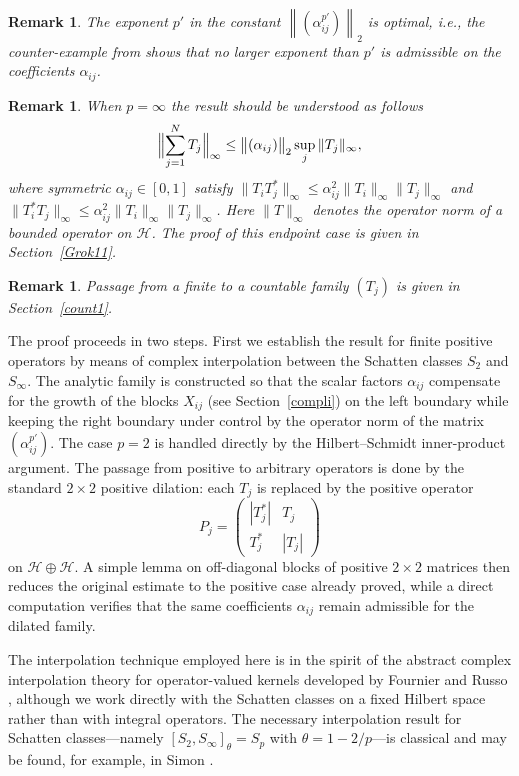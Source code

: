 \documentclass[10pt,a4paper]{amsart}
\newtheorem{remark}[theorem]{Remark}
\newcommand{\norm}[1]{\left\lVert #1 \right\rVert}
\newcommand{\1}{\mathbf{1}}
\begin{document}
\begin{remark}
    The exponent $p'$ in the constant  $\norm{(\alpha_{ij}^{p'})}_{2}$ is optimal, i.e.,  the counter-example from \cite{CDPIMW2026}
   shows that no larger exponent than $p'$ is admissible on the coefficients $\alpha_{ij}$.
\end{remark}

\begin{remark}
    When $p=\infty$ the result should be understood as follows 
\[
\Bigl\|\sum_{j=1}^N T_j\Bigr\|_{\infty}
\leq
\bigl\|(\alpha_{ij})\bigr\|_{2} \sup_{j} 
\|T_j\|_{\infty},
\]
where symmetric  $\alpha_{ij} \in [0,1]$ satisfy $\| T_{i}T_{j}^{*}\|_{\infty}\leq \alpha_{ij}^{2}\|T_{i}\|_{\infty}\|T_{j}\|_{\infty}$ and $\| T_{i}^{*}T_{j}\|_{\infty}\leq \alpha_{ij}^{2}\|T_{i}\|_{\infty}\|T_{j}\|_{\infty}$. Here $\| T\|_{\infty}$ denotes the operator norm of a bounded operator on $\mathcal{H}$. The proof of this endpoint case is given in Section~\ref{Grok11}.
\end{remark}

\begin{remark}
    Passage from a finite to a countable family $(T_{j})$ is given in Section~\ref{count1}.
\end{remark}

The proof proceeds in two steps. First we establish the result for finite positive operators by means of complex interpolation between the Schatten classes $S_2$ and $S_\infty$. The analytic family is constructed so that the scalar factors $\alpha_{ij}$ compensate for the growth of the blocks $X_{ij}$ (see Section~\ref{compli}) on the left boundary while keeping the right boundary under control by the operator norm of the matrix $(\alpha_{ij}^{p'})$. The case $p=2$ is handled directly by the Hilbert--Schmidt inner-product argument. The passage from positive to arbitrary operators is done by the standard $2\times 2$ positive dilation: each $T_j$ is replaced by the positive operator
\[
P_j=\begin{pmatrix}|T_j^*|&T_j\\T_j^*&|T_j|\end{pmatrix}
\]
on $\mathcal{H}\oplus\mathcal{H}$. A simple lemma on off-diagonal blocks of positive $2\times 2$ matrices then reduces the original estimate to the positive case already proved, while a direct computation verifies that the same coefficients $\alpha_{ij}$ remain admissible for the dilated family.

The interpolation technique employed here is in the spirit of the abstract complex interpolation theory for operator-valued kernels developed by Fournier and Russo \cite{FournierRusso1977}, although we work directly with the Schatten classes on a fixed Hilbert space rather than with integral operators. The necessary interpolation result for Schatten classes---namely $[S_2,S_\infty]_\theta=S_p$ with $\theta=1-2/p$---is classical and may be found, for example, in Simon \cite{SimonTraceIdeals}. 
\end{document}

